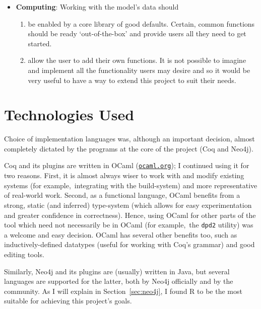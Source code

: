 \begin{itemize}
\begin{enumerate}[label=\textbf{I\arabic*},ref={I\arabic*}]
  \end{enumerate}

  \item \textbf {Computing}: Working with the model's data should
  \begin{enumerate}[label=\textbf{C\arabic*},ref={C\arabic*}]

    \item\label{req:c1} be enabled by a core library of good defaults. Certain,
      common functions should be ready `out-of-the-box' and provide users all
      they need to get started.

    \item\label{req:c2} allow the user to add their own functions. It is not
      possible to imagine and implement all the functionality users may desire
      and so it would be very useful to have a way to extend this project to suit
      their needs.

  \end{enumerate}


\end{itemize}

\section{Technologies Used}

Choice of implementation languages was, although an important decision, almost
completely dictated by the programs at the core of the project (Coq and Neo4j).

Coq and its plugins are written in OCaml
(\href{http://ocaml.org}{\texttt{ocaml.org}}); I continued using it for two reasons.
First, it is almost always wiser to work with and modify existing systems (for example,\
integrating with the build-system) and more representative of real-world work.
Second, as a functional language, OCaml benefits from a strong, static (and
inferred) type-system (which allows for easy experimentation and greater
confidence in correctness). Hence, using OCaml for other parts of the tool which
need not necessarily be in OCaml (for example,\ the \texttt{dpd2} utility) was a welcome
and easy decision. OCaml has several other benefits too, such as
inductively-defined datatypes (useful for working with Coq's grammar) and good
editing tools.

Similarly, Neo4j and its plugins are (usually) written in Java, but several
languages are supported for the latter, both by Neo4j officially and by the
community. As I will explain in Section~\ref{sec:neo4j}, I found R to be the
most suitable for achieving this project's goals.

